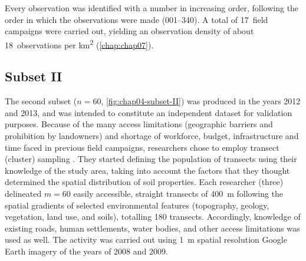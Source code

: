 Every observation was identified with a number in increasing order, following the order in which the 
observations were made (\num{001}--\num{340}). A total of \num{17}~field campaigns were carried out, yielding 
an observation density of about \num{18}~observations per \si{\kilo\metre\squared} (\autoref{chap:chap07}).

\subsection{Subset II}
\label{sec:chap04-subset-ii}

The second subset ($n = 60$, \autoref{fig:chap04-subset-II}) was produced in the years \num{2012} and 
\num{2013}, and was intended to constitute an independent dataset for validation purposes. Because of the many 
access limitations (geographic barriers and prohibition by landowners) and shortage of workforce, budget, 
infrastructure and time faced in previous field campaigns, researchers chose to employ transect (cluster) 
sampling \cite{MiguelEtAl2012, Moura-BuenoEtAl2012, Samuel-RosaEtAl2013}. They started defining the population 
of transects using their knowledge of the study area, taking into account the factors that they thought 
determined the spatial distribution of soil properties. Each researcher (three) delineated $m = 60$ easily 
accessible, straight transects of \SI{400}{\metre} following the spatial gradients of selected environmental 
features (topography, geology, vegetation, land use, and soils), totalling 180 transects. Accordingly, 
knowledge of existing roads, human settlements, water bodies, and other access limitations was used as well. 
The activity was carried out using \SI{1}{\metre} spatial resolution Google Earth\rr{} imagery of the years of 
\num{2008} and \num{2009}.

